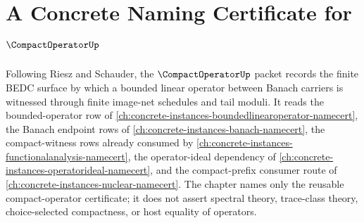 \chapter{A Concrete Naming Certificate for $\CompactOperatorUp$}
\label{ch:concrete-instances-compactoperator-namecert}

Following Riesz and Schauder, the $\CompactOperatorUp$ packet records the finite BEDC surface by which a bounded linear operator between Banach carriers is witnessed through finite image-net schedules and tail moduli. It reads the bounded-operator row of \autoref{ch:concrete-instances-boundedlinearoperator-namecert}, the Banach endpoint rows of \autoref{ch:concrete-instances-banach-namecert}, the compact-witness rows already consumed by \autoref{ch:concrete-instances-functionalanalysis-namecert}, the operator-ideal dependency of \autoref{ch:concrete-instances-operatorideal-namecert}, and the compact-prefix consumer route of \autoref{ch:concrete-instances-nuclear-namecert}. The chapter names only the reusable compact-operator certificate; it does not assert spectral theory, trace-class theory, choice-selected compactness, or host equality of operators.

